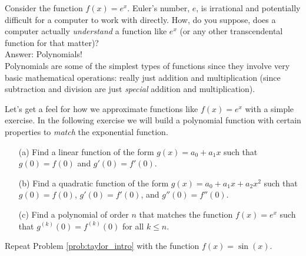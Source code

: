 Consider the function $f(x) = e^x$.  Euler's number, $e$, is irrational and
potentially difficult for a computer to work with directly.  How, do you suppose, does
a computer actually {\it understand} a function like $e^x$ (or any other
transcendental function for that matter)? \\
Answer: Polynomials! \\
Polynomials are some of the simplest types of functions since they involve very basic
mathematical operations: really just addition and multiplication (since subtraction
and division are just {\it special} addition and multiplication).  

Let's get a feel for how we approximate functions like $f(x) = e^x$ with a simple
exercise. In the following exercise we will build a polynomial function with certain
properties to {\it match} the exponential function.
\begin{problem}\label{prob:taylor_intro}
    \begin{enumerate}
        \item[(a)] Find a linear function of the form $g(x) = a_0 + a_1 x$ such that $g(0)
            = f(0)$ and $g'(0) = f'(0)$. 
        \item[(b)] Find a quadratic function of the form $g(x) = a_0 + a_1 x + a_2 x^2$
            such that $g(0) = f(0)$, $g'(0) = f'(0)$, and $g''(0) = f''(0)$. 
        \item[(c)] Find a polynomial of order $n$ that matches the function $f(x) = e^x$
            such that $g^{(k)}(0) = f^{(k)}(0)$ for all $k \le n$. \solution{
                \[ g(x) = 1 + x + \frac{x^2}{2} + \frac{x^3}{3!} + \frac{x^4}{4!} + \cdots
                    + \frac{x^n}{n!}. \]
            }
    \end{enumerate}
\end{problem}

\begin{problem}
    Repeat Problem \ref{prob:taylor_intro} with the function $f(x) = \sin(x)$.
\end{problem}
\solution{
    \[ g(x) = x - \frac{x^3}{3!} + \frac{x^5}{5!} - \frac{x^7}{7!} + \cdots . \]
}

